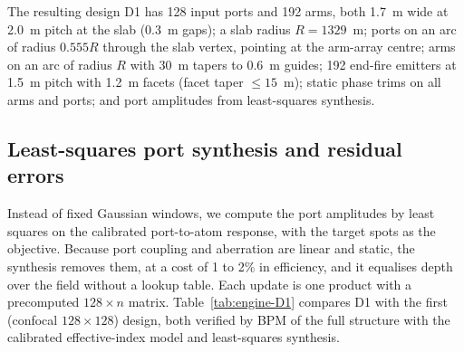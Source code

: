 The resulting design D1 has 128 input ports and 192 arms, both 1.7~\textmu m wide at 2.0~\textmu m pitch at the slab (0.3~\textmu m gaps); a slab radius $R = 1329$~\textmu m; ports on an arc of radius $0.555R$ through the slab vertex, pointing at the arm-array centre; arms on an arc of radius $R$ with 30~\textmu m tapers to 0.6~\textmu m guides; 192 end-fire emitters at 1.5~\textmu m pitch with 1.2~\textmu m facets (facet taper $\le 15$~\textmu m); static phase trims on all arms and ports; and port amplitudes from least-squares synthesis.

\subsection{Least-squares port synthesis and residual errors}\label{sec:engine-LS}

Instead of fixed Gaussian windows, we compute the port amplitudes by least squares on the calibrated port-to-atom response, with the target spots as the objective. Because port coupling and aberration are linear and static, the synthesis removes them, at a cost of 1 to 2\% in efficiency, and it equalises depth over the field without a lookup table. Each update is one product with a precomputed $128\times n$ matrix. Table~\ref{tab:engine-D1} compares D1 with the first (confocal $128\times128$) design, both verified by BPM of the full structure with the calibrated effective-index model and least-squares synthesis.

